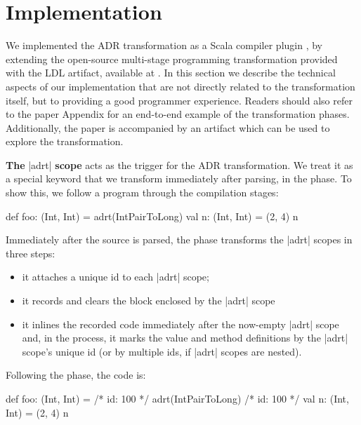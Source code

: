 \section{Implementation}
\label{ildl:sec:impl}

We implemented the ADR transformation as a Scala compiler plugin \cite{ildl-plugin}, by extending the open-source multi-stage programming transformation provided with the LDL \cite{ldl} artifact, available at \cite{ldl-staging-plugin}. In this section we describe the technical aspects of our implementation that are not directly related to the transformation itself, but to providing a good programmer experience. Readers should also refer to the paper Appendix for an end-to-end example of the transformation phases. Additionally, the paper is accompanied by an artifact which can be used to explore the transformation.


\noindent \textbf{The} |adrt| \textbf{scope} acts as the trigger for the ADR transformation.
We treat it as a special keyword that we transform immediately after parsing, in the \postparser{} phase.
To show this, we follow a program through the compilation stages:

\begin{lstlisting-nobreak}
def foo: (Int, Int) = {
  adrt(IntPairToLong) {
    val n: (Int, Int) = (2, 4)
  }
  n
}
\end{lstlisting-nobreak}

\noindent
Immediately after the source is parsed, the \postparser{} phase transforms the |adrt| scopes in three steps:


\begin{itemize}
\item it attaches a unique id to each |adrt| scope;
\item it records and clears the block enclosed by the |adrt| scope
\item it inlines the recorded code immediately after the now-empty
|adrt| scope and, in the process, it marks the value and method definitions
by the |adrt| scope's unique id (or by multiple ids, if |adrt| scopes are nested).
\end{itemize}


\noindent Following the \postparser{} phase, the code is:

\begin{lstlisting-nobreak}
def foo: (Int, Int) = {
  /* id: 100 */ adrt(IntPairToLong) {}
  /* id: 100 */ val n: (Int, Int) = (2, 4)
  n
}
\end{lstlisting-nobreak}

